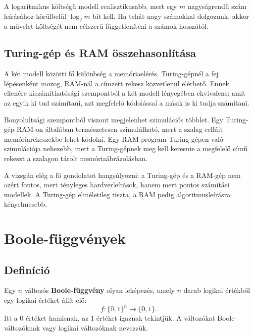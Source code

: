 A logaritmikus költségű modell realisztikusabb, mert egy $m$ nagyságrendű szám leírásához körülbelül $\log_2 m$ bit kell. Ha tehát nagy számokkal dolgozunk, akkor a művelet költségét nem célszerű függetleníteni a számok hosszától.

\subsection{Turing-gép és RAM összehasonlítása}

\begin{center}

\end{center}

A két modell közötti fő különbség a memóriaelérés. Turing-gépnél a fej lépésenként mozog, RAM-nál a címzett rekesz közvetlenül elérhető. Ennek ellenére kiszámíthatósági szempontból a két modell lényegében ekvivalens: amit az egyik ki tud számítani, azt megfelelő kódolással a másik is ki tudja számítani.

Bonyolultsági szempontból viszont megjelenhet szimulációs többlet. Egy Turing-gép RAM-on általában természetesen szimulálható, mert a szalag celláit memóriarekeszekbe lehet kódolni. Egy RAM-program Turing-gépen való szimulációja nehezebb, mert a Turing-gépnek meg kell keresnie a megfelelő című rekeszt a szalagon tárolt memóriaábrázolásban.

\begin{summarybox}
A vizsgán elég a fő gondolatot hangsúlyozni: a Turing-gép és a RAM-gép nem azért fontos, mert tényleges hardverleírások, hanem mert pontos számítási modellek. A Turing-gép elméletileg tiszta, a RAM pedig algoritmusleírásra kényelmesebb.
\end{summarybox}

\section{Boole-függvények}

\subsection{Definíció}

Egy $n$ változós \textbf{Boole-függvény} olyan leképezés, amely $n$ darab logikai értékből egy logikai értéket állít elő:
\[
  f:\{0,1\}^n\to\{0,1\}.
\]
Itt a $0$ értéket hamisnak, az $1$ értéket igaznak tekintjük. A változókat Boole-változóknak vagy logikai változóknak nevezzük.

